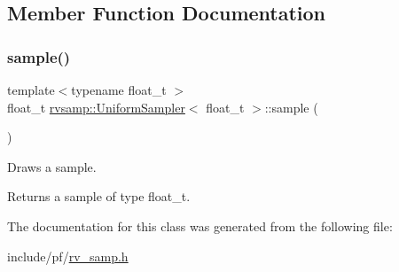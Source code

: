 \subsection{Member Function Documentation}
\mbox{\label{classrvsamp_1_1UniformSampler_acc8866283171489eccc5f643269b6eed}} 
\subsubsection{\texorpdfstring{sample()}{sample()}}
{\footnotesize\ttfamily template$<$typename float\+\_\+t $>$ \\
float\+\_\+t \hyperlink{classrvsamp_1_1UniformSampler}{rvsamp\+::\+Uniform\+Sampler}$<$ float\+\_\+t $>$\+::sample (\begin{DoxyParamCaption}{ }\end{DoxyParamCaption})}



Draws a sample. 

\begin{DoxyReturn}{Returns}
a sample of type float\+\_\+t. 
\end{DoxyReturn}


The documentation for this class was generated from the following file\+:\begin{DoxyCompactItemize}
\item 
include/pf/\hyperlink{rv__samp_8h}{rv\+\_\+samp.\+h}\end{DoxyCompactItemize}
